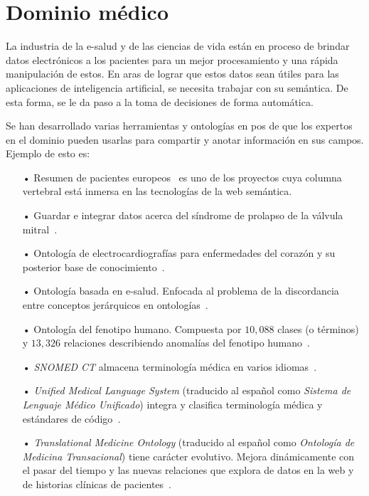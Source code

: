 \vspace{-0.2in}
\section{Dominio médico}

\vspace{-0.1in}
La industria de la e-salud y de las ciencias de vida están en proceso de brindar datos electrónicos a los pacientes para un mejor procesamiento y una rápida manipulación de estos. En aras de lograr que estos datos sean útiles para las aplicaciones de inteligencia artificial, se necesita trabajar con su semántica. De esta forma, se le da paso a la toma de decisiones de forma automática.

Se han desarrollado varias herramientas y ontologías en pos de que los expertos en el dominio pueden usarlas para compartir y anotar información en sus campos. Ejemplo de esto es:

\vspace{-0.1in}
\begin{itemize}
	\item[•] Resumen de pacientes europeos~\cite{ref:85} es uno de los proyectos cuya columna vertebral está inmersa en las tecnologías de la web semántica.
	\item[•] Guardar e integrar datos acerca del síndrome de prolapso de la válvula mitral~\cite{ref:86}.
	\item[•] Ontología de electrocardiografías para enfermedades del corazón y su posterior base de conocimiento~\cite{ref:87}.
	\item[•] Ontología basada en e-salud. Enfocada al problema de la discordancia entre conceptos jerárquicos en ontologías~\cite{ref:88}.
	\item[•] Ontología del fenotipo humano. Compuesta por $10,088$ clases (o términos) y $13,326$ relaciones describiendo anomalías del fenotipo humano~\cite{ref:89}.
	\item[•] \textit{SNOMED CT} almacena terminología médica en varios idiomas~\cite{ref:90,ref:7}.
	\item[•] \textit{Unified Medical Language System} (traducido al español como \textit{Sistema de Lenguaje Médico Unificado}) integra y clasifica terminología médica y estándares de código~\cite{ref:8}.
	\item[•] \textit{Translational Medicine Ontology} (traducido al español como \textit{Ontología de Medicina Transacional})  tiene carácter evolutivo. Mejora dinámicamente con el pasar del tiempo y las nuevas relaciones que explora de datos en la web y de historias clínicas de pacientes~\cite{ref:91}.
\end{itemize}

